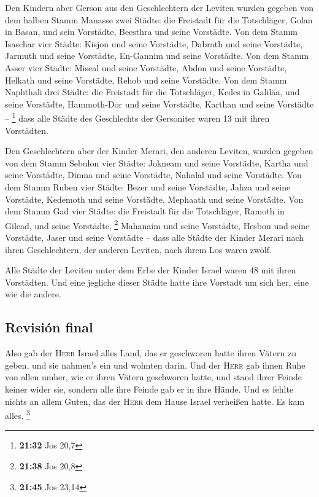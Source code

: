  Den Kindern aber Gerson aus den Geschlechtern der
Leviten wurden gegeben von dem halben Stamm Manasse zwei Städte: die
Freistadt für die Totschläger, Golan in Basan, und sein Vorstädte,
Beesthra und seine Vorstädte.  Von dem Stamm Isaschar
vier Städte: Kisjon und seine Vorstädte, Dabrath und seine Vorstädte,
 Jarmuth und seine Vorstädte, En-Gannim und seine
Vorstädte.  Von dem Stamm Asser vier Städte: Miseal und
seine Vorstädte, Abdon und seine Vorstädte,  Helkath und
seine Vorstädte, Rehob und seine Vorstädte.  Von dem
Stamm Naphthali drei Städte: die Freistadt für die Totschläger, Kedes in
Galiläa, und seine Vorstädte, Hammoth-Dor und seine Vorstädte, Karthan
und seine Vorstädte -- \footnote{\textbf{21:32} Jos 20,7}
 dass alle Städte des Geschlechts der Gersoniter waren 13
mit ihren Vorstädten.

 Den Geschlechtern aber der Kinder Merari, den anderen
Leviten, wurden gegeben von dem Stamm Sebulon vier Städte: Jokneam und
seine Vorstädte, Kartha und seine Vorstädte,  Dimna und
seine Vorstädte, Nahalal und seine Vorstädte.  Von dem
Stamm Ruben vier Städte: Bezer und seine Vorstädte, Jahza und seine
Vorstädte,  Kedemoth und seine Vorstädte, Mephaath und
seine Vorstädte.  Von dem Stamm Gad vier Städte: die
Freistadt für die Totschläger, Ramoth in Gilead, und seine Vorstädte,
\footnote{\textbf{21:38} Jos 20,8}  Mahanaim und seine
Vorstädte, Hesbon und seine Vorstädte, Jaser und seine Vorstädte --
 dass alle Städte der Kinder Merari nach ihren
Geschlechtern, der anderen Leviten, nach ihrem Los waren zwölf.

 Alle Städte der Leviten unter dem Erbe der Kinder Israel
waren 48 mit ihren Vorstädten.  Und eine jegliche dieser
Städte hatte ihre Vorstadt um sich her, eine wie die andere.

\hypertarget{revisiuxf3n-final}{%
\subsection{Revisión final}\label{revisiuxf3n-final}}

 Also gab der \textsc{Herr} Israel alles Land, das er
geschworen hatte ihren Vätern zu geben, und sie nahmen's ein und wohnten
darin.  Und der \textsc{Herr} gab ihnen Ruhe von allen
umher, wie er ihren Vätern geschworen hatte, und stand ihrer Feinde
keiner wider sie, sondern alle ihre Feinde gab er in ihre Hände.
 Und es fehlte nichts an allem Guten, das der
\textsc{Herr} dem Hause Israel verheißen hatte. Es kam alles.
\footnote{\textbf{21:45} Jos 23,14}

